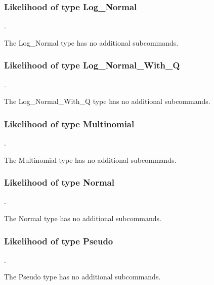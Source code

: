 \subsubsection{Likelihood of type Log\_Normal}
.
\label{syntax:Likelihood-LogNormal}

The Log\_Normal type has no additional subcommands.
\subsubsection{Likelihood of type Log\_Normal\_With\_Q}
.
\label{syntax:Likelihood-LogNormalWithQ}

The Log\_Normal\_With\_Q type has no additional subcommands.
\subsubsection{Likelihood of type Multinomial}
.
\label{syntax:Likelihood-Multinomial}

The Multinomial type has no additional subcommands.
\subsubsection{Likelihood of type Normal}
.
\label{syntax:Likelihood-Normal}

The Normal type has no additional subcommands.
\subsubsection{Likelihood of type Pseudo}
.
\label{syntax:Likelihood-Pseudo}

The Pseudo type has no additional subcommands.
